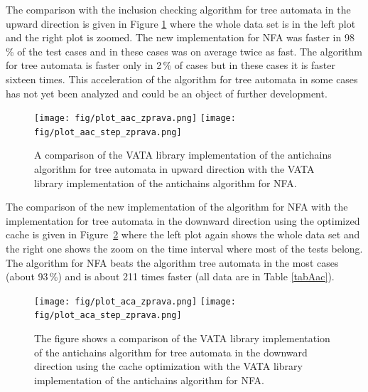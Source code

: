 The comparison with the inclusion checking algorithm for tree automata in the upward direction is given in Figure \ref{fig:figPlotAac} where the whole data
set is in the left plot and the right plot is zoomed. The new implementation for NFA was faster in 98\,\% of the
test cases and in these cases was on average twice as fast. The algorithm for tree automata is faster only in 2\,\% of cases 
but in these cases it is faster sixteen times.
This acceleration of the algorithm for tree automata in some cases has not yet been analyzed and could be an object of further development.

\begin{figure}
\begin{center}
\texttt{[image: fig/plot\_aac\_zprava.png]}
\texttt{[image: fig/plot\_aac\_step\_zprava.png]}
\caption{A comparison of the VATA library implementation of the antichains algorithm for tree automata in upward direction
    with the VATA library implementation of the antichains algorithm for NFA.}
\label{fig:figPlotAac}
\end{center}
\end{figure}

The comparison of the new implementation of the algorithm for NFA with the implementation for tree automata in the downward direction using the optimized cache
is given in Figure~\ref{fig:figPlotAca} 
where the left plot again shows the whole data set and the right one shows the zoom on the time interval where most of the tests belong.
The algorithm for NFA beats the algorithm tree automata in the most cases (about 93\,\%) and is about 211 times faster (all data are in Table \ref{tabAac}).

\begin{figure}
\begin{center}
\texttt{[image: fig/plot\_aca\_zprava.png]}
\texttt{[image: fig/plot\_aca\_step\_zprava.png]}
\caption{The figure shows
 a comparison of the VATA library implementation of the antichains algorithm for tree automata in the downward direction using the cache optimization 
 with the VATA library implementation of the antichains algorithm for NFA.}
\label{fig:figPlotAca}
\end{center}
\end{figure}

